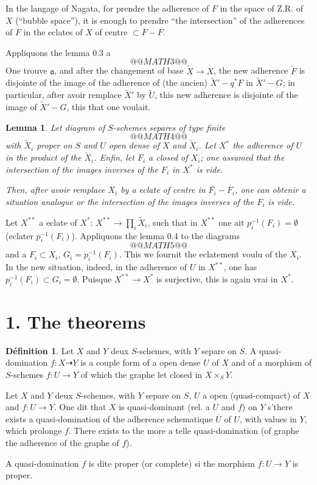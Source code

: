 \documentclass[11pt,a4paper]{article}
\theoremstyle{plain}
\newtheorem{lemma}[theorem]{Lemma}
\theoremstyle{definition}
\newtheorem{definition}[theorem]{D\'efinition}
\begin{document}
In the langage of Nagata, for prendre the adherence of $F$ in the space of Z.R. of $X$ (``bubble space''), it is enough to prendre ``the intersection'' of the adherences of $F$ in the eclates of $X$ of centre $\subset \overline{F} - F$.

Appliquons the lemma 0.3 a
\[
@@MATH3@@
\]
One trouve $\mathfrak{a}$, and after the changement of base $\widetilde{X} \to X$, the new adherence $\widetilde{F}$ is disjointe of the image of the adherence of (the ancien) $\widetilde{X}' - q^*F$ in $\widetilde{X}' - G$; in particular, after avoir remplace $\widetilde{X}'$ by $\widetilde{U}$, this new adherence is disjointe of the image of $\widetilde{X}' - G$, this that one voulait.

\begin{lemma}
Let diagram of $S$-schemes separes of type finite
\[
@@MATH4@@
\]
with $\widetilde{X}_i$ proper on $S$ and $U$ open dense of $X$ and $\widetilde{X}_i$. Let $X^*$ the adherence of $U$ in the product of the $\widetilde{X}_i$. Enfin, let $F_i$ a closed of $X_i$; one assumed that the intersection of the images inverses of the $F_i$ in $X^*$ is vide.

Then, after avoir remplace $X_i$ by a eclate of centre in $\overline{F_i} - F_i$, one can obtenir a situation analogue or the intersection of the images inverses of the $F_i$ is vide.
\end{lemma}

Let $X^{**}$ a eclate of $X^*$: $X^{**} \to \prod_i \widetilde{X}_i$, such that in $X^{**}$ one ait $p_i^{-1}(F_i) = \emptyset$ (eclater $p_i^{-1}(F_i)$). Appliquons the lemma 0.4 to the diagrams
\[
@@MATH5@@
\]
and a $F_i \subset X_i$, $G_i = p_i^{-1}(F_i)$. This we fournit the eclatement voulu of the $X_i$. In the new situation, indeed, in the adherence of $U$ in $X^{**}$, one has $p_i^{-1}(F_i) \subset G_i = \emptyset$. Puisque $X^{**} \to X^*$ is surjective, this is again vrai in $X^*$.

\section*{1. The theorems}

\begin{definition}
Let $X$ and $Y$ deux $S$-schemes, with $Y$ separe on $S$. A quasi-domination $f: X \dashrightarrow Y$ is a couple form of a open dense $U$ of $X$ and of a morphism of $S$-schemes $f: U \to Y$ of which the graphe let closed in $X \times_S Y$.

Let $X$ and $Y$ deux $S$-schemes, with $Y$ separe on $S$, $U$ a open (quasi-compact) of $X$ and $f: U \to Y$. One dit that $X$ is quasi-dominant (rel. a $U$ and $f$) on $Y$ s'there exists a quasi-domination of the adherence schematique $\overline{U}$ of $U$, with values in $Y$, which prolonge $f$. There exists to the more a telle quasi-domination (of graphe the adherence of the graphe of $f$).

A quasi-domination $f$ is dite proper (or complete) si the morphism $f: U \to Y$ is proper.
\end{definition}
\end{document}
